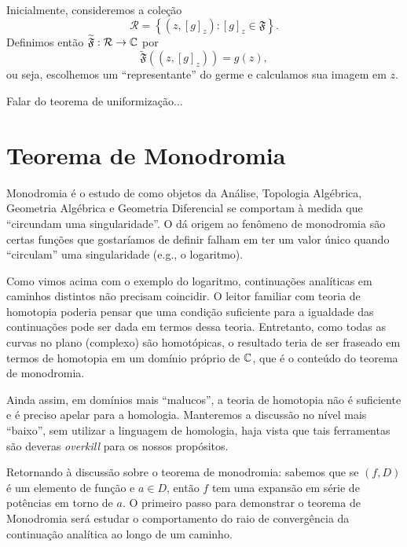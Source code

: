     Inicialmente, consideremos a coleção
    \begin{equation*}
        \mathcal{R} = \left\{ (z, [g]_z) : [g]_z \in \mathfrak{F} \right\}.
    \end{equation*}
    Definimos então $\widetilde{\mathfrak{F}}:\mathcal{R}\to\mathbb{C}$ por
    \begin{equation*}
        \widetilde{\mathfrak{F}}((z, [g]_z)) = g(z),
    \end{equation*}
    ou seja, escolhemos um ``representante'' do germe e calculamos sua imagem em $z$.
    
    {\red Falar do teorema de uniformização...}

\section{Teorema de Monodromia}

    Monodromia é o estudo de como objetos da Análise, Topologia Algébrica, Geometria
    Algébrica e Geometria Diferencial se comportam à medida que 
    ``circundam uma singularidade''. O dá origem ao fenômeno de monodromia são certas
    funções que gostaríamos de definir falham em ter um valor único quando ``circulam''
    uma singularidade (e.g., o logaritmo).
    
    Como vimos acima com o exemplo do logaritmo, continuações analíticas em 
    caminhos distintos não precisam coincidir. O leitor familiar com teoria de
    homotopia poderia pensar que uma condição suficiente para a
    igualdade das continuações pode ser dada em termos dessa teoria. Entretanto,
    como todas as curvas no plano (complexo) são homotópicas, o resultado teria
    de ser fraseado em termos de homotopia em um domínio próprio de $\mathbb{C}$,
    que é o conteúdo do teorema de monodromia.
    
    Ainda assim, em domínios mais ``malucos'', a teoria de homotopia não é suficiente
    e é preciso apelar para a homologia. Manteremos a discussão no nível mais ``baixo'',
    sem utilizar a linguagem de homologia, haja vista que tais
    ferramentas são deveras \textit{overkill} para os nossos propósitos.
    
    Retornando à discussão sobre o teorema de monodromia: sabemos que se $(f,D)$ é
    um elemento de função e $a\in D$, então $f$ tem uma expansão em série de potências
    em torno de $a$. O primeiro passo para demonstrar o teorema de Monodromia será
    estudar o comportamento do raio de convergência da continuação analítica ao longo
    de um caminho.

